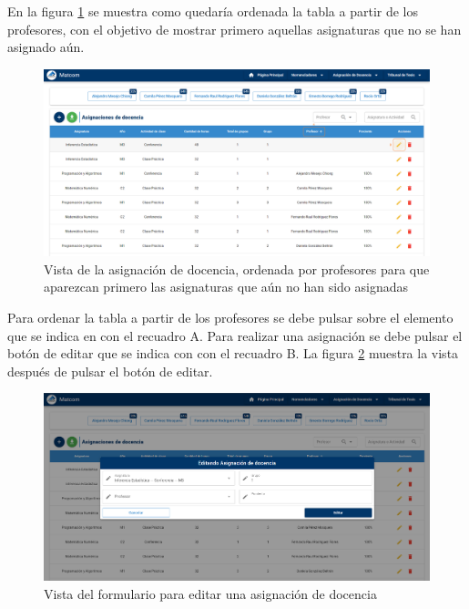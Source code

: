 En la figura \ref{img-ta-ordering} se muestra como quedaría ordenada la tabla a partir de los profesores,
con el objetivo de mostrar primero aquellas 
asignaturas que no se han asignado aún.


\begin{figure}[H]
    \includegraphics[scale=0.3]{Graphics/Implementation/Docencia/AD-sin-asignar.png}
    \caption{Vista de la asignación de docencia, ordenada por profesores para que aparezcan primero las asignaturas que aún no han sido asignadas}
    \label{img-ta-ordering}
\end{figure}


Para ordenar la tabla a partir de los profesores se debe pulsar sobre el elemento que se indica en 
con el recuadro A. Para realizar una asignación se debe pulsar el botón de editar que se indica con
con el recuadro B. La figura \ref{img-ta-edit-form1} muestra la vista después de pulsar el botón de 
editar.  



\begin{figure}[H]
    \includegraphics[scale=0.3]{Graphics/Implementation/Docencia/AD-edit-form.png}
    \caption{Vista del formulario para editar una asignación de docencia}
    \label{img-ta-edit-form1}
\end{figure}


